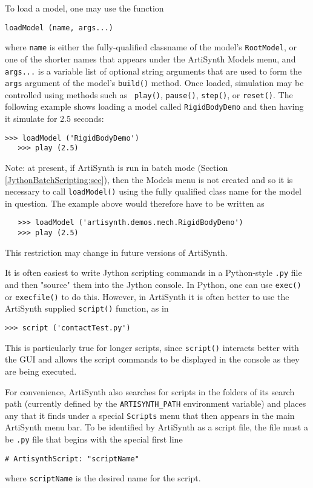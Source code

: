 \documentclass{article}
\begin{document}
To load a model, one may use the function
%
\begin{lstlisting}[]
  loadModel (name, args...)
\end{lstlisting}
%
where {\tt name} is either the fully-qualified classname of the
model's {\tt RootModel}, or one of the shorter names that appears
under the ArtiSynth {\sf Models} menu, and {\tt args...} is a variable
list of optional string arguments that are used to form the {\tt args}
argument of the model's {\tt build()} method.
Once loaded, simulation may be controlled using methods such as {\tt
play()}, {\tt pause()}, {\tt step()}, or {\tt reset()}. The following
example shows loading a model called {\tt RigidBodyDemo} and
then having it simulate for 2.5 seconds:
%
\begin{lstlisting}[]
   >>> loadModel ('RigidBodyDemo')
   >>> play (2.5)
\end{lstlisting}
%
\begin{sideblock}
Note: at present, if ArtiSynth is run in batch mode (Section
\ref{JythonBatchScripting:sec}), then the {\sf Models} menu is not
created and so it is necessary to call {\tt loadModel()} using
the fully qualified class name for the model in question. The example
above would therefore have to be written as
%
\begin{verbatim}
   >>> loadModel ('artisynth.demos.mech.RigidBodyDemo')
   >>> play (2.5)
\end{verbatim}
%
This restriction may change in future versions of ArtiSynth.
\end{sideblock}
%
It is often easiest to write Jython scripting commands in a
Python-style {\tt .py} file and then "source" them into the Jython
console. In Python, one can use {\tt exec()} or {\tt execfile()} to do
this. However, in ArtiSynth it is often better to use the ArtiSynth
supplied {\tt script()} function, as in
%
\begin{lstlisting}[]
   >>> script ('contactTest.py')
\end{lstlisting}
%
This is particularly true for longer scripts, since {\tt script()}
interacts better with the GUI and allows the script commands to be
displayed in the console as they are being executed.

For convenience, ArtiSynth also searches for scripts in the folders of
its search path (currently defined by the {\tt ARTISYNTH\_PATH}
environment variable) and places any that it finds under a special
{\tt Scripts} menu that then appears in the main ArtiSynth menu
bar. To be identified by ArtiSynth as a script file, the file must a
be {\tt .py} file that begins with the special first line
%
\begin{lstlisting}[]
# ArtisynthScript: "scriptName"
\end{lstlisting}
%
where {\tt scriptName} is the desired name for the script.
\end{document}
